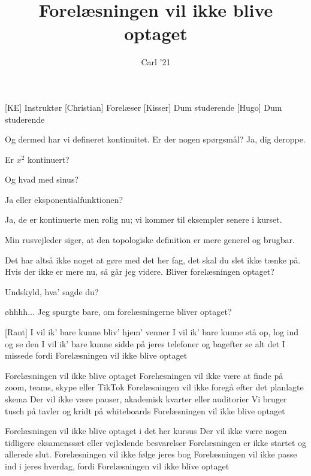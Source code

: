 \documentclass[a4paper,11pt]{article}
\title{Forelæsningen vil ikke blive optaget}
\author{Carl '21}
\begin{document}
\maketitle

\begin{roles}
[KE] Instruktør
[Christian] Forelæser
[Kisser] Dum studerende
[Hugo] Dum studerende

\end{roles}



\begin{song}
 Og dermed har vi defineret kontinuitet. Er der nogen spørgsmål? Ja, dig deroppe.

 Er $x^2$ kontinuert?

 Og hvad med sinus?

 Ja eller eksponentialfunktionen?

 Ja, de er kontinuerte men rolig nu; vi kommer til eksempler senere i kurset.

 Min rusvejleder siger, at den topologiske definition er mere generel og brugbar.

 Det har altså ikke noget at gøre med det her fag, det skal du slet ikke tænke på. Hvis der ikke er mere nu, så går jeg videre.
 Bliver forelæsningen optaget?

 Undskyld, hva' sagde du?

 øhhhh... Jeg spurgte bare, om forelæsningerne bliver optaget?

[Rant] I vil ik’ bare kunne bliv’ hjem’ venner
I vil ik’ bare kunne stå op, log ind og se den
I vil ik’ bare kunne sidde på jeres telefoner
og bagefter se alt det I missede fordi
Forelæsningen vil ikke blive optaget

Forelæsningen vil ikke blive optaget
Forelæsningen vil ikke være at finde på zoom, teams, skype eller TikTok
Forelæsningen vil ikke foregå efter det planlagte skema
Der vil ikke være pauser, akademisk kvarter eller auditorier
Vi bruger tusch på tavler og kridt på whiteboards
Forelæsningen vil ikke blive optaget

Forelæsningen vil ikke blive optaget i det her kursus
Der vil ikke være nogen tidligere eksamenssæt eller vejledende besvarelser
Forelæsningen er ikke startet og allerede slut.
Forelæsningen vil ikke følge jeres bog
Forelæsningen vil ikke passe ind i jeres hverdag, fordi
Forelæsningen vil ikke blive optaget


\end{song}
\end{document}
